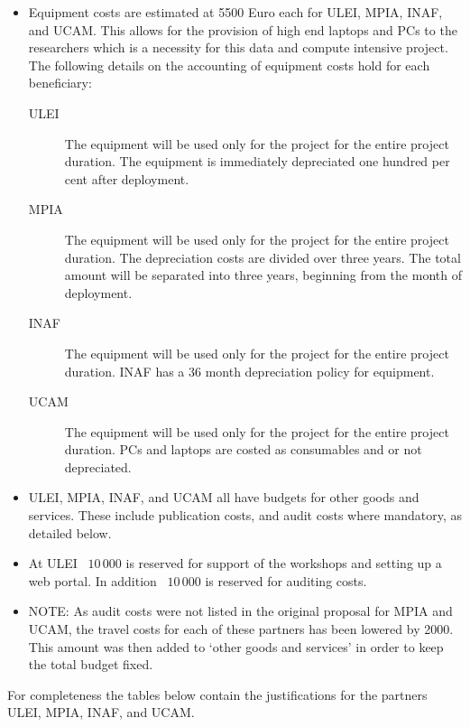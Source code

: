 \begin{itemize}
\begin{itemize}
    \end{itemize}
    \item Equipment costs are estimated at 5500 Euro each for ULEI, MPIA, INAF, and UCAM. This allows for the provision of high end laptops and PCs to the researchers which is a necessity for this data and compute intensive project. The following details on the accounting of equipment costs hold for each beneficiary:
    \begin{description}
        \item[ULEI] The equipment will be used only for the project for the entire project duration. The equipment is immediately depreciated one hundred per cent after deployment.
        \item[MPIA] The equipment will be used only for the project for the entire project duration. The depreciation costs are divided over three years. The total amount will be separated into three years, beginning from the month of deployment.
        \item[INAF] The equipment will be used only for the project for the entire project duration. INAF has a 36 month depreciation policy for equipment.
        \item[UCAM] The equipment will be used only for the project for the entire project duration. PCs and laptops are costed as consumables and or not depreciated.
    \end{description}
    \item ULEI, MPIA, INAF, and UCAM all have budgets for other goods and services. These include publication costs, and audit costs where mandatory, as detailed below.
    \item At ULEI \EUR\ $10\,000$ is reserved for support of the workshops and setting up a web portal. In addition \EUR\ $10\,000$ is reserved for auditing costs.
    \item NOTE: As audit costs were not listed in the original proposal for MPIA and UCAM, the travel costs for each of these partners has been lowered by 2000\EUR. This amount was then added to `other goods and services' in order to keep the total budget fixed.
\end{itemize}

\noindent
For completeness the tables below contain the justifications for the partners ULEI, MPIA, INAF, and UCAM.
\medskip


